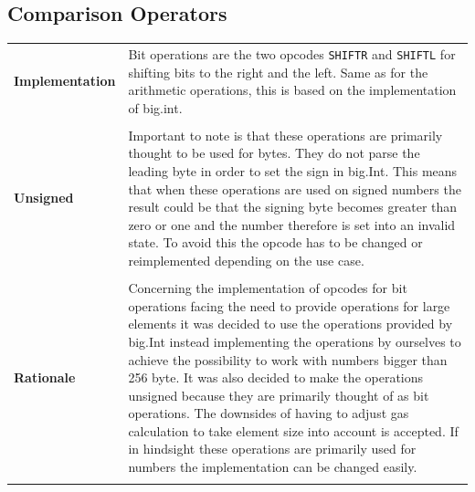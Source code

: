 \subsection{Comparison Operators}
\begin{tabular}[t]{ p{3cm} p{12.5cm}}
\raggedright
\textbf{Implementation} &
Bit operations are the two opcodes \texttt{SHIFTR} and \texttt{SHIFTL} for shifting bits to the right and the left. Same as for the arithmetic operations, this is based on the implementation of big.int. \\ \\

\raggedright
\textbf{Unsigned} &
Important to note is that these operations are primarily thought to be used for bytes. They do not parse the leading byte in order to set the sign in big.Int. This means that when these operations are used on signed numbers the result could be that the signing byte becomes greater than zero or one and the number therefore is set into an invalid state. To avoid this the opcode has to be changed or reimplemented depending on the use case. \\ \\

\raggedright
\textbf{Rationale} &
Concerning the implementation of opcodes for bit operations facing the need to provide operations for large elements it was decided to use the operations provided by big.Int instead implementing the operations by ourselves to achieve the possibility to work with numbers bigger than 256 byte. It was also decided to make the operations unsigned because they are primarily thought of as bit operations. The downsides of having to adjust gas calculation to take element size into account is accepted. If in hindsight these operations are primarily used for numbers the implementation can be changed easily. \\ \\
\end{tabular}

